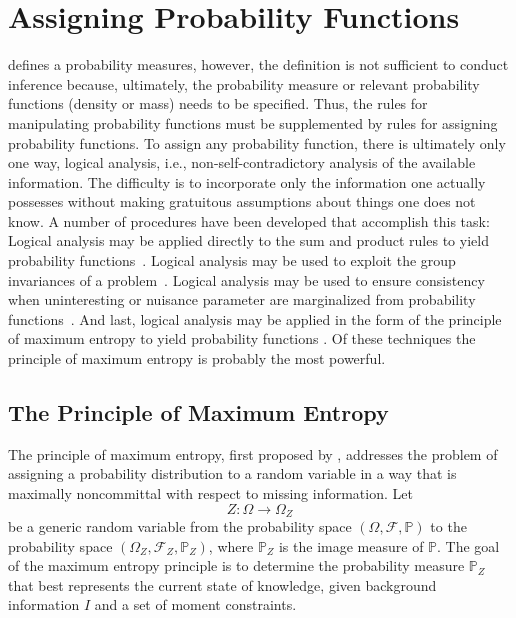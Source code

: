 \chapter{Assigning Probability Functions}
 defines a probability measures, however, the definition is not sufficient to conduct inference because, ultimately, the probability measure or relevant probability functions (density or mass) needs to be specified. Thus, the rules for manipulating probability functions must be supplemented by rules for assigning probability functions. To assign any probability function, there is ultimately only one way, logical analysis, i.e., non-self-contradictory analysis of the available information. The difficulty is to incorporate only the information one actually possesses without making gratuitous assumptions about things one does not know. A number of procedures have been developed that accomplish this task: Logical analysis may be applied directly to the sum and product rules to yield probability functions~\citep{jaynes_11}. Logical analysis may be used to exploit the group invariances of a problem~\citep{jaynes_16}. Logical analysis may be used to ensure consistency when uninteresting or nuisance parameter are marginalized from probability functions~\citep{jaynes_21}. And last, logical analysis may be applied in the form of the principle of maximum entropy to yield probability functions \cite{zellner_bayesian_inference, jaynes_16,jaynes_19, shore_17,shore_18}. Of these techniques the principle of maximum entropy is probably the most powerful.

\section{The Principle of Maximum Entropy}
\label{sec:maxent}
The principle of maximum entropy, first proposed by \citet{Jaynes1957}, addresses the problem of assigning a probability distribution to a random variable in a way that is maximally noncommittal with respect to missing information. Let
\begin{equation}
	Z: \Omega \to \Omega_Z
\end{equation}
be a generic random variable from the probability space $(\Omega, \mathcal{F}, \mathbb{P})$ to the probability space $(\Omega_Z,\mathcal{F}_Z, \mathbb{P}_Z)$, where $\mathbb{P}_Z$ is the image measure of $\mathbb{P}$. The goal of the maximum entropy principle is to determine the probability measure $\mathbb{P}_Z$ that best represents the current state of knowledge, given background information $I$ and a set of moment constraints. 


